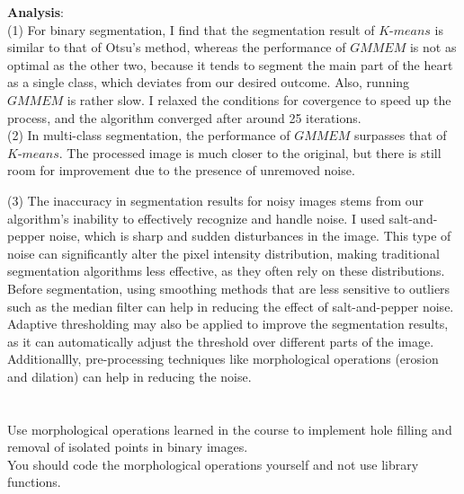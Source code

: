 \documentclass[UTF8]{ctexart}
\begin{document}
\textbf{Analysis}:\\
(1) For binary segmentation, I find that the segmentation result of $\textit{K-means}$ is similar to that of Otsu's method, whereas the performance of $\textit{GMMEM}$ is not as optimal as the other two,
because it tends to segment the main part of the heart as a single class, which deviates from our desired outcome. Also, running $\textit{GMMEM}$
is rather slow. I relaxed the conditions for covergence to speed up the process, and the algorithm converged after around 25 iterations.\\

(2) In multi-class segmentation, the performance of $\textit{GMMEM}$ surpasses that of $\textit{K-means}$. 
The processed image is much closer to the original, but there is still room for improvement due to the presence of unremoved noise.

(3) The inaccuracy in segmentation results for noisy images stems from our algorithm's inability to effectively recognize and handle noise. 
I used salt-and-pepper noise, which is sharp and sudden disturbances in the image. 
This type of noise can significantly alter the pixel intensity distribution, making traditional segmentation algorithms less effective, as they often rely on these distributions.\\
Before segmentation, using smoothing methods that are less sensitive to outliers such as the median filter can help in reducing the effect of salt-and-pepper noise.
Adaptive thresholding may also be applied to improve the segmentation results, as it can automatically adjust the threshold  over different parts of the image.
Additionallly, pre-processing techniques like morphological operations (erosion and dilation) can help in reducing the noise. 

\section{}
Use morphological operations learned in the course to implement hole filling and removal of isolated points in binary images.\\
You should code the morphological operations yourself and not use library functions.\\
\end{document}
